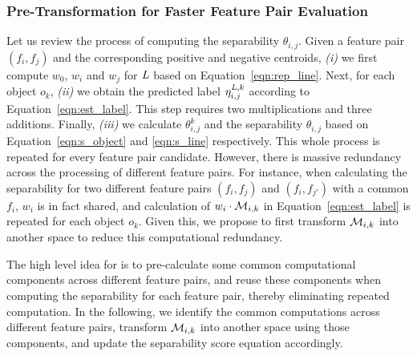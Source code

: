 \subsubsection{Pre-Transformation for Faster Feature Pair Evaluation} \label{ssec:trans}

Let us review the process of computing the separability $\theta_{i,j}$. Given a feature pair $(f_i,f_j)$ and the corresponding positive and negative centroids, {\em (i)} we first compute $w_0$, $w_i$ and $w_j$ for $\mathit{L}$ based on Equation~\ref{eqn:rep_line}. Next, for each object $o_k$, {\em (ii)} we obtain the predicted label $\eta_{i,j}^{\mathit{L},k}$ according to Equation~\ref{eqn:est_label}. This step requires two multiplications and three additions. Finally, {\em (iii)} we calculate $\theta_{i,j}^{k}$ and the separability $\theta_{i,j}$ based on Equation~\ref{eqn:s_object} and \ref{eqn:s_line} respectively. This whole process is repeated for every feature pair candidate. However, there is massive redundancy across the processing of different feature pairs. For instance, when calculating the separability for two different feature pairs $(f_i,f_j)$ and $(f_i,f_{j'})$ with a common $f_i$, $w_i$ is in fact shared, and calculation of $w_i\cdot {\mathcal{M}}_{i,k}$ in Equation~\ref{eqn:est_label} is repeated for each object $o_k$. Given this, we propose to first transform ${\mathcal{M}}_{i,k}$ into another space to reduce this computational redundancy.

 The high level idea for \trans is to pre-calculate some common computational components across different feature pairs, and reuse these components when computing the separability for each feature pair, thereby eliminating repeated computation. In the following, we identify the common computations across different feature pairs, transform ${\mathcal{M}}_{i,k}$ into another space using those components, and update the separability score equation accordingly.

